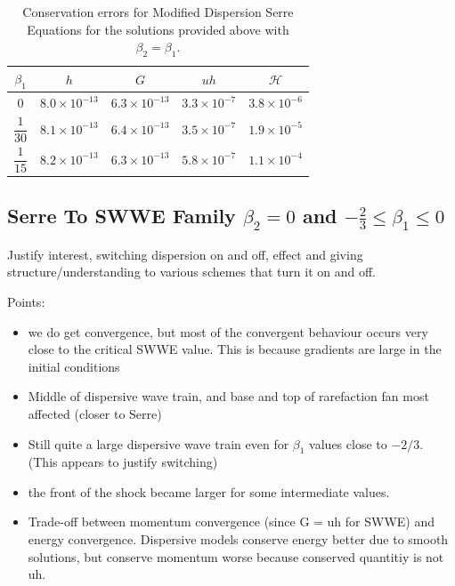 \documentclass[10pt]{elsarticle}
\newcommand\T{\rule{0pt}{3ex }}       %
\begin{document}
\begin{table}
	\centering
	\begin{tabular}{ c | c | c | c | c }
		$\beta_1$ & $h$ & $G$ & $uh$ & $\mathcal{H}$  \\
		\hline
		\T $0$ &	$8.0 \times 10^{-13}$ & $6.3 \times 10^{-13}$  & $3.3 \times 10^{-7}$ &	 $3.8 \times 10^{-6}$ \\
		\T$\dfrac{1}{30}$ & $8.1 \times 10^{-13}$ &	$6.4 \times 10^{-13}$ & $3.5 \times 10^{-7}$	 &	$1.9 \times 10^{-5}$ \\
		\T$\dfrac{1}{15}$ & $8.2 \times 10^{-13}$ &	$6.3 \times 10^{-13}$ & $5.8 \times 10^{-7}$	 &	$1.1 \times 10^{-4}$ \\
		
	\end{tabular}
	\caption{Conservation errors for Modified Dispersion Serre Equations for the solutions provided above with $\beta_2 = \beta_1 $.}
\end{table}



\subsection{Serre To SWWE Family $\beta_2 = 0$ and $-\frac{2}{3} \le \beta_1 \le 0$}
Justify interest, switching dispersion on and off, effect and giving structure/understanding to various schemes that turn it on and off.

Points:
\begin{itemize}
	\item we do get convergence, but most of the convergent behaviour occurs very close to the critical SWWE value. This is because gradients are large in the initial conditions
	\item Middle of dispersive wave train, and base and top of rarefaction fan most affected (closer to Serre)
	\item Still quite a large dispersive wave train even for $\beta_1$ values close to $-2/3$. (This appears to justify switching)
	\item the front of the shock became larger for some intermediate values.
	\item Trade-off between momentum convergence (since G = uh for SWWE) and energy convergence. Dispersive models conserve energy better due to smooth solutions, but conserve momentum worse because conserved quantitiy is not uh. 
\end{itemize}
\end{document}
